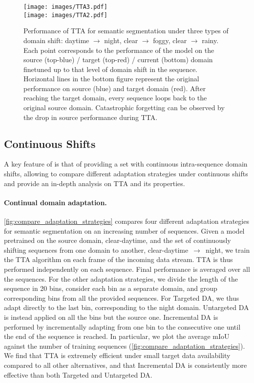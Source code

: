 \begin{figure*}[t]
    \centering
    \vspace{-1em}
    \texttt{[image: images/TTA3.pdf]} \\
    \texttt{[image: images/TTA2.pdf]}
  \caption{Performance of TTA for semantic segmentation under three types of domain shift: daytime $\xrightarrow{}$ night, clear $\xrightarrow{}$ foggy, clear $\xrightarrow{}$ rainy. Each point corresponds to the performance of the model on the source (top-blue) / target (top-red) / current (bottom) domain finetuned up to that level of domain shift in the sequence. Horizontal lines in the bottom figure represent the original performance on source (blue) and target domain (red). After reaching the target domain, every sequence loops back to the original source domain. Catastrophic forgetting can be observed by the drop in source performance during TTA.}
    \label{fig:tta_loop_back}
\end{figure*}

\subsection{Continuous Shifts} \label{ssec:exp_continuous}
A key feature of \thedataset{} is that of providing a set with continuous intra-sequence domain shifts, allowing to compare different adaptation strategies under continuous shifts and provide an in-depth analysis on TTA and its properties.

\paragraph{Continual domain adaptation.} \autoref{fig:compare_adaptation_strategies} compares four different adaptation strategies for semantic segmentation on an increasing number of sequences.
Given a model pretrained on the source domain, \ie{} clear-daytime, and the set of continuously shifting sequences from one domain to another, \ie{} clear-daytime~$\xrightarrow{}$~night, we train the TTA algorithm on each frame of the incoming data stream. TTA is thus performed independently on each sequence. Final performance is averaged over all the sequences.
For the other adaptation strategies, we divide the length of the sequence in 20 bins, consider each bin as a separate domain, and group corresponding bins from all the provided sequences. For Targeted DA, we thus adapt directly to the last bin, corresponding to the night domain. Untargeted DA is instead applied on all the bins but the source one. Incremental DA is performed by incrementally adapting from one bin to the consecutive one until the end of the sequence is reached. 
In particular, we plot the average mIoU against the number of training sequences (\autoref{fig:compare_adaptation_strategies}).
We find that TTA is extremely efficient under small target data availability compared to all other alternatives, and that Incremental DA is consistently more effective than both Targeted and Untargeted DA.

